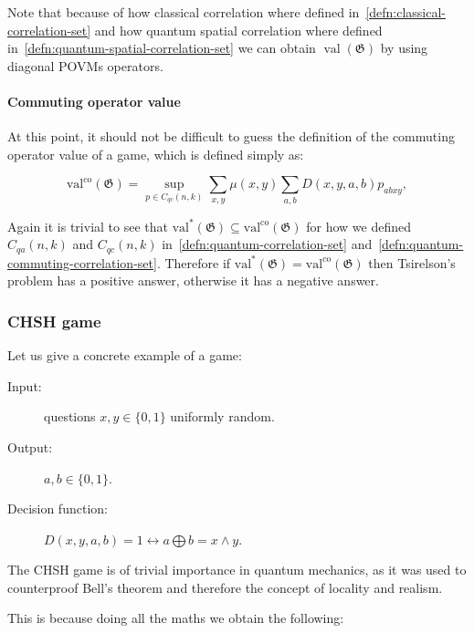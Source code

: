 Note that because of how classical correlation where defined in~\ref{defn:classical-correlation-set} and how quantum spatial correlation where defined in~\ref{defn:quantum-spatial-correlation-set} we can obtain $\operatorname{val}(\mathfrak{G})$ by using diagonal POVMs operators.  

\paragraph{Commuting operator value}

At this point, it should not be difficult to guess the definition of the commuting operator value of a game, which is defined simply as:

\begin{defn}
    \begin{equation}
    \operatorname{val^\text{co}}(\mathfrak{G})=\sup _{p \in C_{q c}(n, k)} \sum_{x, y} \mu(x, y) \sum_{a, b} D(x, y, a, b) p_{a b x y},
    \end{equation}
\end{defn}

Again it is trivial to see that $\operatorname{val^{*}}(\mathfrak{G}) \subseteq \operatorname{val^\text{co}}(\mathfrak{G})$ for how we defined $C_{q a}(n, k)$ and $C_{q c}(n, k)$ in~\ref{defn:quantum-correlation-set} and~\ref{defn:quantum-commuting-correlation-set}.
Therefore if $\operatorname{val^{*}}(\mathfrak{G}) = \operatorname{val^\text{co}}(\mathfrak{G})$ then Tsirelson's problem has a positive answer, otherwise it has a negative answer.


\subsubsection{CHSH game}

Let us give a concrete example of a game:
\begin{description}
\item[Input:]questions $x,y \in \{0,1\}$ uniformly random.
\item[Output:]$a,b \in \{0,1\}$.
\item[Decision function: ]$D(x, y, a, b) = 1 \leftrightarrow a \bigoplus b = x \land y $. 
\end{description}

The CHSH game is of trivial importance in quantum mechanics, as it was used to counterproof Bell's theorem and therefore the concept of locality and realism.


This is because  doing all the maths we obtain the following:

